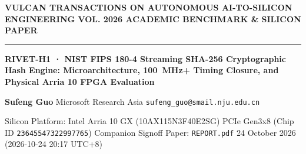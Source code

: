 \documentclass[11pt,a4paper]{article}
\begin{document}
{\scriptsize\sffamily\textcolor{vulcan}{\textbf{VULCAN TRANSACTIONS ON AUTONOMOUS AI-TO-SILICON ENGINEERING \hfill VOL. 2026 \textperiodcentered{} ACADEMIC BENCHMARK \& SILICON PAPER}}\par}

\vspace{1pt}\textcolor{vulcan}{\rule{\textwidth}{1.2pt}}\vspace{3pt}

\begin{center}

{\sffamily\LARGE\bfseries RIVET-H1 · NIST FIPS 180-4 Streaming SHA-256 Cryptographic Hash Engine: Microarchitecture, 100~MHz+ Timing Closure, and Physical Arria 10 FPGA Evaluation\par}\vspace{3pt}

{\small\sffamily\textbf{Sufeng Guo} \textperiodcentered{} Microsoft Research Asia \textperiodcentered{} \texttt{sufeng\_guo@smail.nju.edu.cn}\par}\vspace{1pt}

{\scriptsize\sffamily\textcolor{black!75}{Silicon Platform: Intel Arria 10 GX (\allowbreak{}10AX115N3F40E2SG)\allowbreak{} PCIe Gen3x8 (Chip ID \texttt{23645547322997765}) \textperiodcentered{} Companion Signoff Paper: \texttt{REPORT.pdf} \textperiodcentered{} 24 October 2026 (\allowbreak{}2026-10-24 20:17 UTC+\allowbreak{}8)\allowbreak{}}\par}

\end{center}\vspace{2pt}
\end{document}

